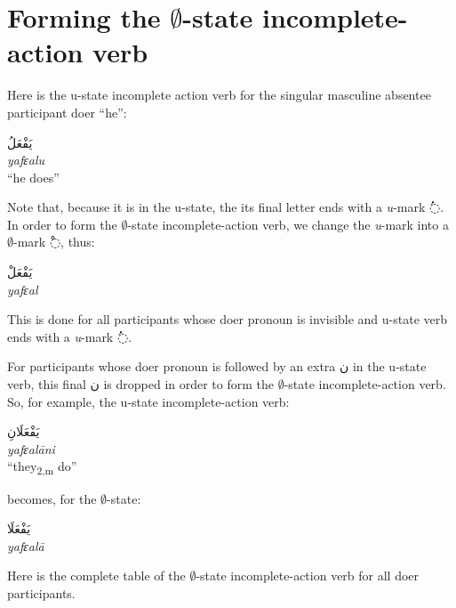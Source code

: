 \documentclass[
  10pt,
]{book}
\begin{document}
\section{\texorpdfstring{Forming the \(\emptyset\)-state incomplete-action verb}{Forming the \textbackslash emptyset-state incomplete-action verb}}\label{forming-the-emptyset-state-incomplete-action-verb}

Here is the u-state incomplete action verb for the singular masculine absentee participant doer \enquote{he}:

\foreignlanguage{arabic}{يَفْعَلُ}\\
\emph{yafɛalu}\\
\enquote{he does}

Note that, because it is in the u-state, the its final letter ends with a \emph{u}-mark \foreignlanguage{arabic}{◌ُ}.
In order to form the
\(\emptyset\)-state
incomplete-action verb,
we change the \emph{u}-mark into a
\(\emptyset\)-mark \foreignlanguage{arabic}{◌ْ}, thus:

\foreignlanguage{arabic}{يَفْعَلْ}\\
\emph{yafɛal}

This is done for all participants whose doer pronoun is invisible and u-state verb ends with a \emph{u}-mark \foreignlanguage{arabic}{◌ُ}.

For participants whose doer pronoun is followed by an extra \foreignlanguage{arabic}{ن} in the u-state verb, this final \foreignlanguage{arabic}{ن} is dropped in order to form the
\(\emptyset\)-state
incomplete-action verb.
So, for example, the u-state
incomplete-action verb:

\foreignlanguage{arabic}{يَفْعَلَانِ}\\
\emph{yafɛalāni}\\
\enquote{they\textsubscript{2,m} do}

becomes, for the
\(\emptyset\)-state:

\foreignlanguage{arabic}{يَفْعَلَا}\\
\emph{yafɛalā}

Here is the complete table of the
\(\emptyset\)-state
incomplete-action verb
for all doer participants.
\end{document}
